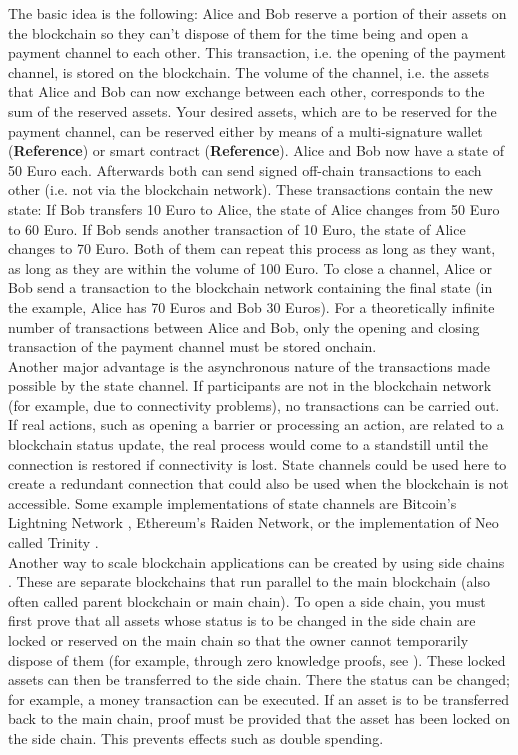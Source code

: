 \documentclass[conference]{IEEEtran}
\begin{document}
The basic idea is the following: Alice and Bob reserve a portion of their assets on the blockchain so they can't dispose of them for the time being and open a payment channel to each other. This transaction, i.e. the opening of the payment channel, is stored on the blockchain. The volume of the channel, i.e. the assets that Alice and Bob can now exchange between each other, corresponds to the sum of the reserved assets. Your desired assets, which are to be reserved for the payment channel, can be reserved either by means of a multi-signature wallet (\textbf{Reference}) or smart contract (\textbf{Reference}). Alice and Bob now have a state of 50 Euro each. Afterwards both can send signed off-chain transactions to each other (i.e. not via the blockchain network). These transactions contain the new state: If Bob transfers 10 Euro to Alice, the state of Alice changes from 50 Euro to 60 Euro. If Bob sends another transaction of 10 Euro, the state of Alice changes to 70 Euro. Both of them can repeat this process as long as they want, as long as they are within the volume of 100 Euro. To close a channel, Alice or Bob send a transaction to the blockchain network containing the final state (in the example, Alice has 70 Euros and Bob 30 Euros). For a theoretically infinite number of transactions between Alice and Bob, only the opening and closing transaction of the payment channel must be stored onchain.\\
Another major advantage is the asynchronous nature of the transactions made possible by the state channel. If participants are not in the blockchain network (for example, due to connectivity problems), no transactions can be carried out. If real actions, such as opening a barrier or processing an action, are related to a blockchain status update, the real process would come to a standstill until the connection is restored if connectivity is lost. State channels could be used here to create a redundant connection that could also be used when the blockchain is not accessible. Some example implementations of state channels are Bitcoin's Lightning Network \cite{Lightning2016}, Ethereum's Raiden Network, or the implementation of Neo called Trinity \cite{Trinity2018}.\\
Another way to scale blockchain applications can be created by using side chains \cite{sidechain2019}. These are separate blockchains that run parallel to the main blockchain (also often called parent blockchain or main chain). To open a side chain, you must first prove that all assets whose status is to be changed in the side chain are locked or reserved on the main chain so that the owner cannot temporarily dispose of them (for example, through zero knowledge proofs, see \cite{zeroknowledge2020}). These locked assets can then be transferred to the side chain. There the status can be changed; for example, a money transaction can be executed. If an asset is to be transferred back to the main chain, proof must be provided that the asset has been locked on the side chain. This prevents effects such as double spending.\\
\end{document}
